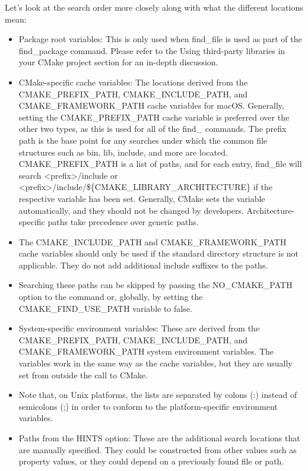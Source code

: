 Let's look at the search order more closely along with what the different locations mean:

\begin{itemize}
\item 
Package root variables: This is only used when find\_file is used as part of the find\_package command. Please refer to the Using third-party libraries in your CMake project section for an in-depth discussion.

\item 
CMake-specific cache variables: The locations derived from the CMAKE\_PREFIX\_PATH, CMAKE\_INCLUDE\_PATH, and CMAKE\_FRAMEWORK\_PATH cache variables for macOS. Generally, setting the CMAKE\_PREFIX\_PATH cache variable is preferred over the other two types, as this is used for all of the find\_ commands. The prefix path is the base point for any searches under which the common file structures such as bin, lib, include, and more are located. CMAKE\_PREFIX\_PATH is a list of paths, and for each entry, find\_file will search <prefix>/include or <prefix>/include/\$\{CMAKE\_LIBRARY\_ARCHITECTURE\} if the respective variable has been set. Generally, CMake sets the variable automatically, and they should not be changed by developers. Architecture-specific paths take precedence over generic paths.

\item 
The CMAKE\_INCLUDE\_PATH and CMAKE\_FRAMEWORK\_PATH cache variables should only be used if the standard directory structure is not applicable. They do not add additional include suffixes to the paths.

\item 
Searching these paths can be skipped by passing the NO\_CMAKE\_PATH option to the command or, globally, by setting the CMAKE\_FIND\_USE\_PATH variable to false.

\item 
System-specific environment variables: These are derived from the CMAKE\_PREFIX\_PATH, CMAKE\_INCLUDE\_PATH, and CMAKE\_FRAMEWORK\_PATH system environment variables. The variables work in the same way as the cache variables, but they are usually set from outside the call to CMake.

\item 
Note that, on Unix platforms, the lists are separated by colons (:) instead of semicolons (;) in order to conform to the platform-specific environment variables.

\item 
Paths from the HINTS option: These are the additional search locations that are manually specified. They could be constructed from other values such as property values, or they could depend on a previously found file or path.


\end{itemize}
